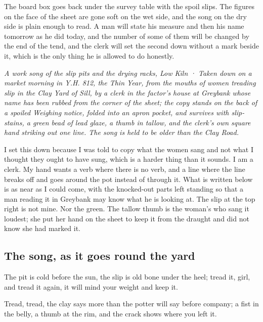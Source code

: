 \documentclass{design/chronicle}
\begin{document}
The board box goes back under the survey table with the spoil slips. The figures on the face of the sheet are gone soft on the wet side, and the song on the dry side is plain enough to read. A man will state his measure and then his name tomorrow as he did today, and the number of some of them will be changed by the end of the tend, and the clerk will set the second down without a mark beside it, which is the only thing he is allowed to do honestly.

\clearpage{}
{\centering\FellFont\itshape\footnotesize\color{faded} A work song of the slip pits and the drying racks, Low Kiln · Taken down on a market morning in Y.H. 812, the Thin Year, from the mouths of women treading slip in the Clay Yard of Sill, by a clerk in the factor’s house at Greybank whose name has been rubbed from the corner of the sheet; the copy stands on the back of a spoiled Weighing notice, folded into an apron pocket, and survives with slip-stains, a green bead of lead glaze, a thumb in tallow, and the clerk’s own square hand striking out one line. The song is held to be older than the Clay Road.\par}\medskip
I set this down because I was told to copy what the women sang and not what I thought they ought to have sung, which is a harder thing than it sounds. I am a clerk. My hand wants a verb where there is no verb, and a line where the line breaks off and goes around the pot instead of through it. What is written below is as near as I could come, with the knocked-out parts left standing so that a man reading it in Greybank may know what he is looking at. The slip at the top right is not mine. Nor the green. The tallow thumb is the woman’s who sang it loudest; she put her hand on the sheet to keep it from the draught and did not know she had marked it.

\subsection*{The song, as it goes round the yard}

The pit is cold before the sun, the slip is old bone under the heel; tread it, girl, and tread it again, it will mind your weight and keep it.

Tread, tread, the clay says more than the potter will say before company; a fist in the belly, a thumb at the rim, and the crack shows where you left it.
\end{document}

